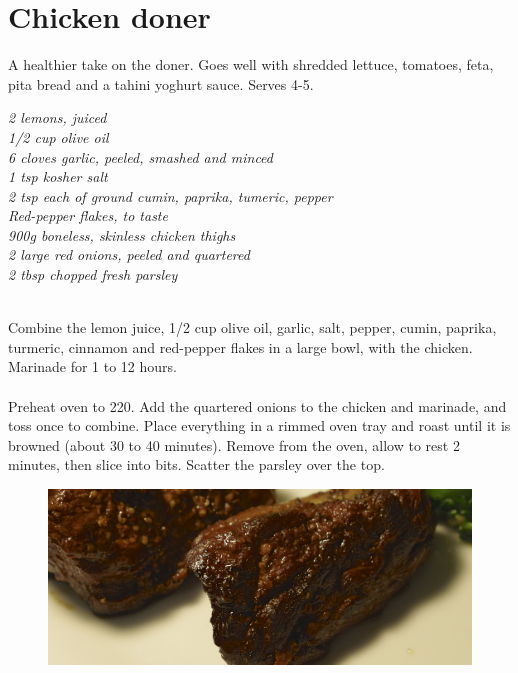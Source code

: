 \documentclass{tufte-book}
\begin{document}
\section{Chicken doner}

A healthier take on the doner. Goes well with shredded lettuce, tomatoes, feta, pita bread and a tahini yoghurt sauce. Serves 4-5.

\smallskip
\emph{2 lemons, juiced
\\1/2 cup olive oil
\\6 cloves garlic, peeled, smashed and minced
\\1 tsp kosher salt
\\2 tsp each of ground cumin, paprika, tumeric, pepper
\\Red-pepper flakes, to taste
\\900g boneless, skinless chicken thighs
\\2 large red onions, peeled and quartered
\\2 tbsp chopped fresh parsley}

\smallskip
{} 
\\Combine the lemon juice, 1/2 cup olive oil, garlic, salt, pepper, cumin, paprika, turmeric, cinnamon and red-pepper flakes in a large bowl, with the chicken. Marinade for 1 to 12 hours.
\\ 
\\Preheat oven to 220\celsius. Add the quartered onions to the chicken and marinade, and toss once to combine. Place everything in a rimmed oven tray and roast until it is browned (about 30 to 40 minutes). Remove from the oven, allow to rest 2 minutes, then slice into bits. Scatter the parsley over the top.

\newpage

\begin{figure}[h]
  \includegraphics[width=\linewidth]{lambwithmint.png}
\end{figure}
\end{document}
